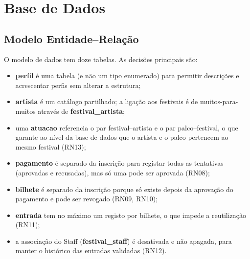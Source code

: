 \chapter{Base de Dados}
\label{cap:bd}

\newcommand{\entidade}[4]{%
  \node[draw, thick, fill=white, inner sep=0pt, anchor=north, font=\scriptsize]
    (#1) at (#2)
    {\begin{tabular}{@{\,}l@{\;\;}l@{\;\;}l@{\,}}
       \multicolumn{3}{c}{\rule{0pt}{2.6ex}\small\textbf{#3}}\\[0.4ex] \hline
       #4
     \end{tabular}};}
\newcommand{\relER}[5]{%
  \draw[thin] (#1) --
    node[pos=0.5, fill=white, inner sep=1pt, font=\scriptsize\itshape]{#3}
    node[pos=0.1, auto, font=\scriptsize\bfseries]{#4}
    node[pos=0.9, auto, font=\scriptsize\bfseries]{#5} (#2);}

\section{Modelo Entidade--Relação}

O modelo de dados tem doze tabelas. As decisões principais são:
\begin{itemize}
  \item \textbf{perfil} é uma tabela (e não um tipo enumerado) para permitir
        descrições e acrescentar perfis sem alterar a estrutura;
  \item \textbf{artista} é um catálogo partilhado; a ligação aos festivais é
        de muitos-para-muitos através de \textbf{festival\_artista};
  \item uma \textbf{atuacao} referencia o par festival--artista e o par
        palco--festival, o que garante ao nível da base de dados que o artista
        e o palco pertencem ao mesmo festival (RN13);
  \item \textbf{pagamento} é separado da inscrição para registar todas as
        tentativas (aprovadas e recusadas), mas só uma pode ser aprovada
        (RN08);
  \item \textbf{bilhete} é separado da inscrição porque só existe depois da
        aprovação do pagamento e pode ser revogado (RN09, RN10);
  \item \textbf{entrada} tem no máximo um registo por bilhete, o que impede a
        reutilização (RN11);
  \item a associação do Staff (\textbf{festival\_staff}) é desativada e não
        apagada, para manter o histórico das entradas validadas (RN12).
\end{itemize}

